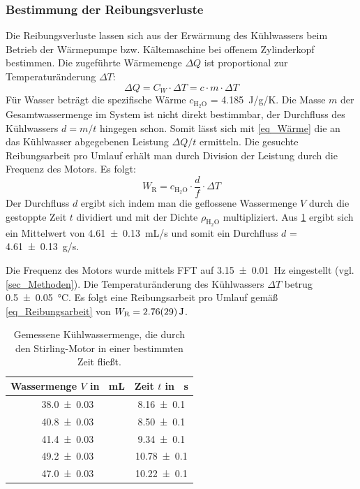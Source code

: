 \documentclass[
	a4paper,
	12pt,
	pagesize,
	ngerman
]{scrartcl}
\begin{document}
	\subsubsection{Bestimmung der Reibungsverluste}
	Die Reibungsverluste lassen sich aus der Erwärmung des Kühlwassers beim Betrieb der Wärmepumpe bzw. Kältemaschine bei offenem Zylinderkopf bestimmen.
	Die zugeführte Wärmemenge $\Delta{Q}$ ist proportional zur Temperaturänderung $\Delta{T}$:
	\begin{equation}
	\Delta{Q} = C_W \cdot \Delta{T} = c \cdot m \cdot \Delta{T}
	\label{eq_Wärme}
	\end{equation} 
	Für Wasser beträgt die spezifische Wärme $c_{\text{H}_2\text{O}}$ = \SI{4,185}{J/g/K}. %
	Die Masse $m$ der Gesamtwassermenge im System ist nicht direkt bestimmbar, der Durchfluss des Kühlwassers $d=m/t$ hingegen schon.
	Somit lässt sich mit \cref{eq_Wärme} die an das Kühlwasser abgegebenen Leistung $\Delta{Q}/t$ ermitteln.
	Die gesuchte Reibungsarbeit pro Umlauf erhält man durch Division der Leistung durch die Frequenz des Motors.
	Es folgt:
	\begin{equation}
	W_\text{R} = c_{\text{H}_2\text{O}} \cdot \frac{d}{f} \cdot \Delta{T} 
	\label{eq_Reibungsarbeit}
	\end{equation}
	Der Durchfluss $d$ ergibt sich indem man die geflossene Wassermenge $V$ durch die gestoppte Zeit $t$ dividiert und mit der Dichte $\rho_{\text{H}_2\text{O}}$ multipliziert. Aus \cref{tab_Durchfluss} ergibt sich ein Mittelwert von \SI{4,61+-0,13}{mL/s} und somit ein Durchfluss $d$ = \SI{4,61+-0,13}{g/s}.
	
	Die Frequenz des Motors wurde mittels FFT auf \SI{3,15+-0,01}{Hz} eingestellt (vgl. \cref{sec_Methoden}).
	Die Temperaturänderung des Kühlwassers $\Delta{T}$ betrug \SI{0,5+-0,05}{\degreeCelsius}.
	Es folgt eine Reibungsarbeit pro Umlauf gemäß \cref{eq_Reibungsarbeit} von $W_\text{R}=\SI{2,76+-0,29}{J}$.
	\begin{table}[H]
		\centering
		\begin{tabular}{ c | c }
			Wassermenge $V$ in \SI{}{mL} & Zeit $t$ in \SI{}{s} \\ \hline
			\SI{38,0+-0,03}{}&\SI{8,16+-0,1}{}\\
			\SI{40,8+-0,03}{}&\SI{8,50+-0,1}{}\\
			\SI{41,4+-0,03}{}&\SI{9,34+-0,1}{}\\
			\SI{49,2+-0,03}{}&\SI{10,78+-0,1}{}\\
			\SI{47,0+-0,03}{}&\SI{10,22+-0,1}{}\\
		\end{tabular}
		\caption{Gemessene Kühlwassermenge, die durch den Stirling-Motor in einer bestimmten Zeit fließt.}
		\label{tab_Durchfluss} 
	\end{table}
	
\end{document}
